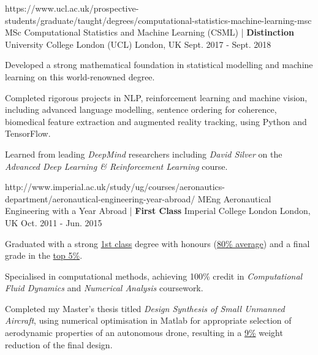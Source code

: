 

\begin{cventries}


  \cventry
    {https://www.ucl.ac.uk/prospective-students/graduate/taught/degrees/computational-statistics-machine-learning-msc}
    {MSc Computational Statistics and Machine Learning (CSML) | \textbf{Distinction}} %
    {University College London (UCL)} %
    {London, UK} %
    {Sept. 2017 - Sept. 2018} %
    {
      \begin{cvitems} %
        \item {Developed a strong mathematical foundation in statistical modelling and machine learning on this world-renowned degree.}
        \item {Completed rigorous projects in NLP, reinforcement learning and machine vision, including advanced language modelling, sentence ordering for coherence, biomedical feature extraction and augmented reality tracking, using Python and TensorFlow.}
        \item {Learned from leading \emph{DeepMind} researchers including \emph{David Silver} on the \emph{Advanced Deep Learning \& Reinforcement Learning} course.}
      \end{cvitems}
    }
    
  \cventry
    {http://www.imperial.ac.uk/study/ug/courses/aeronautics-department/aeronautical-engineering-year-abroad/}
    {MEng Aeronautical Engineering with a Year Abroad | \textbf{First Class}} %
    {Imperial College London} %
    {London, UK} %
    {Oct. 2011 - Jun. 2015} %
    {
      \begin{cvitems} %
        \item {Graduated with a strong \underline{1st class} degree with honours (\underline{80\% average}) and a final grade in the \underline{top 5\%}.}
        \item {Specialised in computational methods, achieving 100\% credit in \emph{Computational Fluid Dynamics} and \emph{Numerical Analysis} coursework.}
        \item {Completed my Master's thesis titled \emph{Design Synthesis of Small Unmanned Aircraft}, using numerical optimisation in Matlab for appropriate selection of aerodynamic properties of an autonomous drone, resulting in a \underline{9\%} weight reduction of the final design.}
      \end{cvitems}
    }


\end{cventries}
